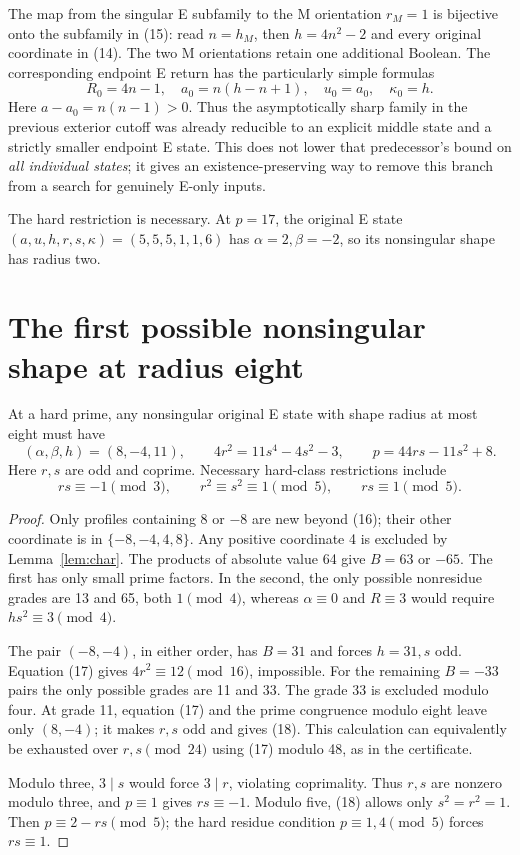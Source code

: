 The map from the singular E subfamily to the M orientation $r_M=1$ is bijective
onto the subfamily in (15): read $n=h_M$, then $h=4n^2-2$ and every original
coordinate in (14). The two M orientations retain one additional Boolean.
The corresponding endpoint E return has the particularly simple formulas
\[
 R_0=4n-1,\quad a_0=n(h-n+1),\quad u_0=a_0,\quad\kappa_0=h.
\]
Here $a-a_0=n(n-1)>0$. Thus the asymptotically sharp family in the previous
exterior cutoff was already reducible to an explicit middle state and a strictly
smaller endpoint E state. This does not lower that predecessor's bound on
\emph{all individual states}; it gives an existence-preserving way to remove
this branch from a search for genuinely E-only inputs.

The hard restriction is necessary. At $p=17$, the original E state
$(a,u,h,r,s,\kappa)=(5,5,5,1,1,6)$ has $\alpha=2,\beta=-2$, so its nonsingular
shape has radius two.

\section{The first possible nonsingular shape at radius eight}
\begin{theorem}\label{thm:eight}
At a hard prime, any nonsingular original E state with shape radius at most eight
must have
\[
 \boxed{(\alpha,\beta,h)=(8,-4,11),\qquad
 4r^2=11s^4-4s^2-3,\qquad p=44rs-11s^2+8.}               \tag{18}
\]
Here $r,s$ are odd and coprime. Necessary hard-class restrictions include
\[
 rs\equiv-1\pmod3,\qquad r^2\equiv s^2\equiv1\pmod5,
 \qquad rs\equiv1\pmod5.
\]
\end{theorem}
\begin{proof}
Only profiles containing $8$ or $-8$ are new beyond (16); their other coordinate
is in $\{-8,-4,4,8\}$. Any positive coordinate 4 is excluded by
Lemma~\ref{lem:char}. The products of absolute value 64 give $B=63$ or $-65$.
The first has only small prime factors. In the second, the only possible
nonresidue grades are 13 and 65, both $1\pmod4$, whereas $\alpha\equiv0$ and
$R\equiv3$ would require $hs^2\equiv3\pmod4$.

The pair $(-8,-4)$, in either order, has $B=31$ and forces $h=31,s$ odd.
Equation (17) gives $4r^2\equiv12\pmod{16}$, impossible.
For the remaining $B=-33$ pairs the only possible grades are 11 and 33.
The grade 33 is excluded modulo four. At grade 11, equation (17) and the prime
congruence modulo eight leave only $(8,-4)$; it makes $r,s$ odd and gives (18).
This calculation can equivalently be exhausted over $r,s\pmod{24}$ using (17)
modulo 48, as in the certificate.

Modulo three, $3\mid s$ would force $3\mid r$, violating coprimality.
Thus $r,s$ are nonzero modulo three, and $p\equiv1$ gives $rs\equiv-1$.
Modulo five, (18) allows only $s^2=r^2=1$. Then $p\equiv2-rs\pmod5$;
the hard residue condition $p\equiv1,4\pmod5$ forces $rs\equiv1$.
\end{proof}

